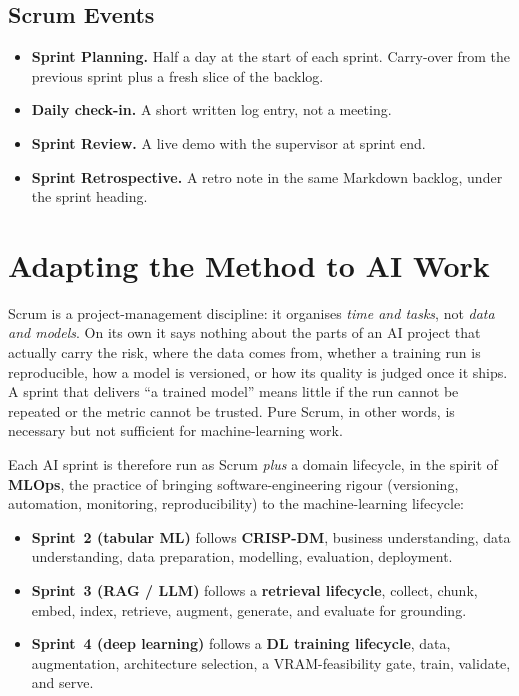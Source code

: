 \documentclass[12pt, a4paper, oneside]{report}
\begin{document}
\subsection{Scrum Events}

\begin{itemize}
    \item \textbf{Sprint Planning.} Half a day at the start of each
        sprint. Carry-over from the previous sprint plus a fresh
        slice of the backlog.
    \item \textbf{Daily check-in.} A short written log entry, not a
        meeting.
    \item \textbf{Sprint Review.} A live demo with the supervisor at
        sprint end.
    \item \textbf{Sprint Retrospective.} A retro note in the same
        Markdown backlog, under the sprint heading.
\end{itemize}

\section{Adapting the Method to AI Work}

Scrum is a project-management discipline: it organises \emph{time and
tasks}, not \emph{data and models}. On its own it says nothing about the
parts of an AI project that actually carry the risk, where the data
comes from, whether a training run is reproducible, how a model is
versioned, or how its quality is judged once it ships. A sprint that
delivers ``a trained model'' means little if the run cannot be repeated
or the metric cannot be trusted. Pure Scrum, in other words, is
necessary but not sufficient for machine-learning work.

Each AI sprint is therefore run as Scrum \emph{plus} a domain lifecycle,
in the spirit of \textbf{MLOps}, the practice of bringing
software-engineering rigour (versioning, automation, monitoring,
reproducibility) to the machine-learning lifecycle:

\begin{itemize}
    \item \textbf{Sprint~2 (tabular ML)} follows \textbf{CRISP-DM}, business understanding, data understanding, data preparation,
        modelling, evaluation, deployment.
    \item \textbf{Sprint~3 (RAG / LLM)} follows a \textbf{retrieval
        lifecycle}, collect, chunk, embed, index, retrieve, augment,
        generate, and evaluate for grounding.
    \item \textbf{Sprint~4 (deep learning)} follows a \textbf{DL
        training lifecycle}, data, augmentation, architecture
        selection, a VRAM-feasibility gate, train, validate, and serve.
\end{itemize}
\end{document}
